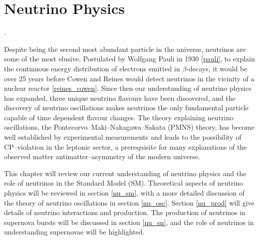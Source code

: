 \chapter{\label{ch:2-neutrinophysics}Neutrino Physics} 


. 
 

\minitoc

Despite being the second most abundant particle in the universe, neutrinos are 
some of the most elusive. Postulated by Wolfgang Pauli in 1930 \ref{pauli}, to 
explain the continuous energy distribution of electrons emitted in 
\(\beta\)-decays, it would be over 25 years before Cowen and Reines would detect 
neutrinos in the vicinity of a nuclear reactor \ref{reines_cowen}. Since then
our understanding of neutrino physics has expanded, three unique neutrino 
flavours have been discovered, and the discovery of neutrino oscillations makes 
neutrinos the only fundamental particle capable of time dependent flavour 
changes. The theory explaining neutrino oscillations, the 
Pontecorvo–Maki–Nakagawa–Sakata (PMNS) theory, has become well established by 
experimental measurements and leads to the possibility of CP--violation in the 
leptonic sector, a prerequisite for many explanations of the observed matter 
antimatter--asymmetry of the modern universe. 

This chapter will review our current understanding of neutrino physics and the 
role of neutrinos in the Standard Model (SM).  Theoretical aspects of neutrino 
physics will be reviewed in section \ref{nu_sm}, with a more detailed 
discussion of the theory of neutrino oscillations in section \ref{nu_osc}.  
Section \ref{nu_prod} will give details of neutrino interactions and production. 
The production of neutrinos in supernova bursts will be discussed in section 
\ref{nu_sn}, and the role of neutrinos in understanding supernovae will be 
highlighted.

